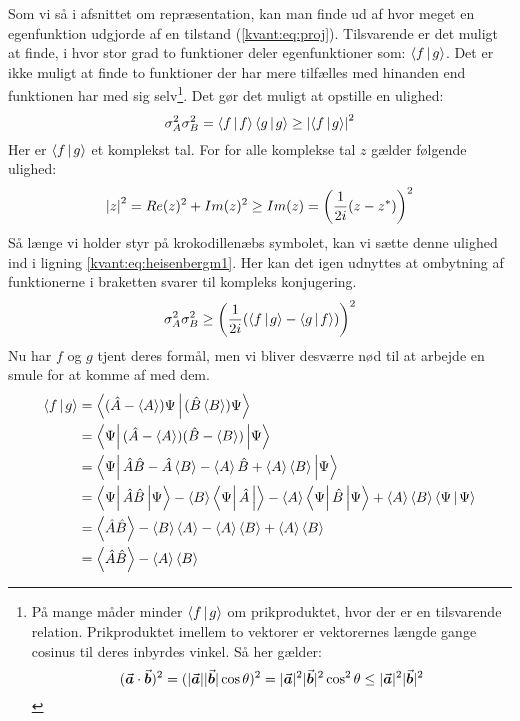 \documentclass[../Kvantemekanik.tex]{subfiles}
\begin{document}
Som vi så i afsnittet om repræsentation, kan man finde ud af hvor meget en egenfunktion udgjorde af en tilstand (\eqref{kvant:eq:proj}).
Tilsvarende er det muligt at finde, i hvor stor grad to funktioner deler egenfunktioner som: $\braket{f}{g}$. Det er ikke muligt at finde to funktioner der har mere tilfælles med hinanden end funktionen har med sig selv\footnote{
På mange måder minder $\braket{f}{g}$ om prikproduktet, hvor der er en tilsvarende relation. Prikproduktet imellem to vektorer er vektorernes længde gange cosinus til deres inbyrdes vinkel. Så her gælder:
$$
({\vec{\boldsymbol{a}}} \cdot {\vec{\boldsymbol{b}}})^2 = (|{{\vec{\boldsymbol{a}}}}||{{\vec{\boldsymbol{b}}}}|\cos\theta)^2 = |{\vec{\boldsymbol{a}}}|^2|{\vec{\boldsymbol{b}}}|^2\cos^2\theta\leq |{\vec{\boldsymbol{a}}}|^2|{\vec{\boldsymbol{b}}}|^2 
$$
}. Det gør det muligt at opstille en ulighed:
\begin{equation}
    \sigma_A^2\sigma_B^2 =\braket{f}{f}\braket{g}{g}\geq \abs{\braket{f}{g}}^2
    \label{kvant:eq:heisenbergm1}
\end{equation}
Her er $\braket{f}{g}$ et komplekst tal. For for alle komplekse tal $z$ gælder følgende ulighed:
\begin{equation}
    \left| z \right|^2= Re(z)^2+Im(z)^2\geq Im(z) = \left(\frac{1}{2i}(z-z^*)\right)^2
\end{equation}
Så længe vi holder styr på krokodillenæbs symbolet, kan vi sætte denne ulighed ind i ligning \eqref{kvant:eq:heisenbergm1}. Her kan det igen udnyttes at ombytning af funktionerne i braketten svarer til kompleks konjugering.
\begin{equation}
    \sigma_A^2\sigma_B^2\geq \left(\frac{1}{2i}(\braket{f}{g}-\braket{g}{f})\right)^2
    \label{kvant:eq:heisenbergm2}
\end{equation}
Nu har $f$ og $g$ tjent deres formål, men vi bliver desværre nød til at arbejde en smule for at komme af med dem.
\begin{align*}
    \braket{f}{g} &= \braket{(\op A-\expect A)\Psi}{(\op B \expect B)\Psi}\\
    &=\matrixel{\Psi}{(\op A - \expect A)(\op B - \expect B)}{\Psi}\\
    &= \matrixel{\Psi}{\op A\op B -\op A \expect B - \expect A \op B + \expect A\expect B}{\Psi}\\
    &=\matrixel{\Psi}{\op A\op B}{\Psi}-\expect B\matrixel{\Psi}{\op A}{}-\expect A\matrixel{\Psi}{\op B}{\Psi} + \expect A\expect B\braket{\Psi}{\Psi}\\
    &=\expect{\op A \op B}-\expect B \expect A - \expect A \expect B + \expect A\expect B\\
    &=\expect{\op A\op B}-\expect A\expect B
\end{align*}
\end{document}
